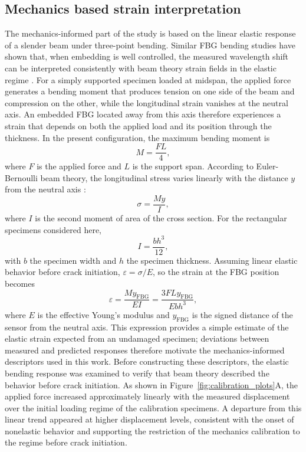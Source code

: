 \documentclass[fleqn,10pt]{wlscirep}
\begin{document}
\FloatBarrier

\subsection*{Mechanics based strain interpretation}

The mechanics-informed part of the study is based on the linear elastic response of a slender beam under three-point bending. Similar FBG bending studies have shown that, when embedding is well controlled, the measured wavelength shift can be interpreted consistently with beam theory strain fields in the elastic regime \cite{gabardi2023}. For a simply supported specimen loaded at midspan, the applied force generates a bending moment that produces tension on one side of the beam and compression on the other, while the longitudinal strain vanishes at the neutral axis. An embedded FBG located away from this axis therefore experiences a strain that depends on both the applied load and its position through the thickness. In the present configuration, the maximum bending moment is
\[
M = \frac{F L}{4},
\]
where $F$ is the applied force and $L$ is the support span. According to Euler-Bernoulli beam theory, the longitudinal stress varies linearly with the distance $y$ from the neutral axis \cite{ochsner2021}:
\[
\sigma = \frac{M y}{I},
\]
where $I$ is the second moment of area of the cross section. For the rectangular specimens considered here,
\[
I = \frac{b h^3}{12},
\]
with $b$ the specimen width and $h$ the specimen thickness. Assuming linear elastic behavior before crack initiation, $\varepsilon = \sigma / E$, so the strain at the FBG position becomes
\begin{equation}
\varepsilon = \frac{M y_{\mathrm{FBG}}}{E I} = \frac{3 F L y_{\mathrm{FBG}}}{E b h^3},
\label{eq:euler_bernoulli_strain}
\end{equation}
where $E$ is the effective Young's modulus and $y_{\mathrm{FBG}}$ is the signed distance of the sensor from the neutral axis. This expression provides a simple estimate of the elastic strain expected from an undamaged specimen; deviations between measured and predicted responses therefore motivate the mechanics-informed descriptors used in this work. Before constructing these descriptors, the elastic bending response was examined to verify that beam theory described the behavior before crack initiation. As shown in Figure~\ref{fig:calibration_plots}A, the applied force increased approximately linearly with the measured displacement over the initial loading regime of the calibration specimens. A departure from this linear trend appeared at higher displacement levels, consistent with the onset of nonelastic behavior and supporting the restriction of the mechanics calibration to the regime before crack initiation.
\end{document}
